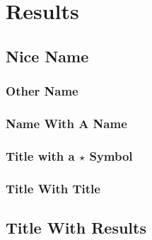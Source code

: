 \chapter[RESULTS]{Results} \label{chap:results}
\pagestyle{myheadings}

\kant[41]  %

\section{Nice Name}\label{sec:results_A}

\kant[1-4]  %

\subsection{Other Name}\label{subsec:results_A_A}

\kant[5-8]  %
    
\subsection{Name With A Name}\label{subsec:results_A_B}

\kant[9]  %
    
\subsection{Title with a \texorpdfstring{$\star$}{star} Symbol}\label{subsec:results_A_C}

\kant[10-12]  %

\subsection{Title With Title}\label{sec:results_A_D}
    
\kant[22-31]  %

\section{Title With Results}\label{sec:results_B}

\kant[32-36]  %

%
